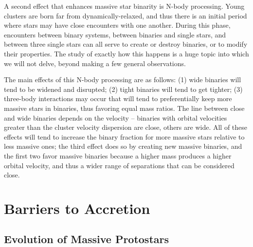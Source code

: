 A second effect that enhances massive star binarity is N-body processing. Young clusters are born far from dynamically-relaxed, and thus there is an initial period where stars may have close encounters with one another. During this phase, encounters between binary systems, between binaries and single stars, and between three single stars can all serve to create or destroy binaries, or to modify their properties. The study of exactly how this happens is a huge topic into which we will not delve, beyond making a few general observations.

The main effects of this N-body processing are as follows: (1) wide binaries will tend to be widened and disrupted; (2) tight binaries will tend to get tighter; (3) three-body interactions may occur that will tend to preferentially keep more massive stars in binaries, thus favoring equal mass ratios. The line between close and wide binaries depends on the velocity -- binaries with orbital velocities greater than the cluster velocity dispersion are close, others are wide. All of these effects will tend to increase the binary fraction for more massive stars relative to less massive ones; the third effect does so by creating new massive binaries, and the first two favor massive binaries because a higher mass produces a higher orbital velocity, and thus a wider range of separations that can be considered close.

\section{Barriers to Accretion}

\subsection{Evolution of Massive Protostars}

